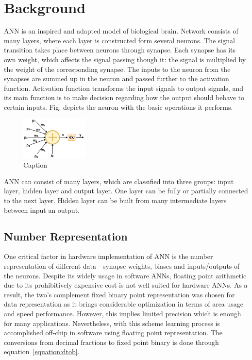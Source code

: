\section{Background}

ANN is an inspired and adapted model of biological brain. Network consists of many layers, where each layer is constructed form several neurons. The signal transition takes place between neurons through synapse. Each synapse has its own weight, which affects the signal passing though it: the signal is multiplied by the weight of the corresponding synapse. The inputs to the neuron from the synapses are summed up in the neuron and passed further to the activation function. Activation function transforms the input signals to output signals, and its main function is to make decision regarding how the output should behave to certain inputs. Fig. depicts the neuron with the basic operations it performs. 


\begin{figure}[h!]
    \centering
    \includegraphics[width = 0.3\textwidth]{Figures/ANN.pdf}
    \caption{Caption}
    \label{fig:my_label}
\end{figure}

ANN can consist of many layers, which are classified into three groups: input layer, hidden layer and output layer. One layer can be fully or partially connected to the next layer. Hidden layer can be built from many intermediate layers between input an output. 

\subsection*{Number Representation}

One critical factor in hardware implementation of ANN is the number representation of different data - synapse weights, biases and inputs/outputs of the neurons. Despite its widely usage in software ANNs, floating point arithmetic due to its prohibitively expensive cost is not well suited for hardware ANNs. As a result, the two's complement fixed binary point representation was chosen for data representation as it brings considerable optimization in terms of area usage and speed performance. However, this implies limited precision which is enough for many applications. Nevertheless, with this scheme learning process is accomplished off-chip in software using floating point representation. The conversions from decimal fractions to fixed point binary is done through equation~\ref{equation:dtob}.

